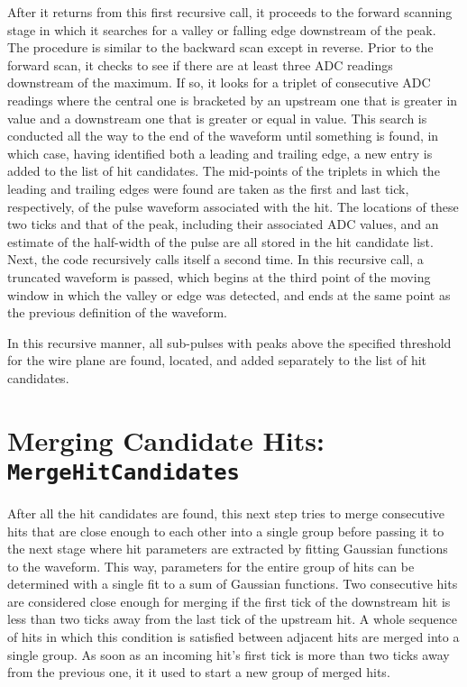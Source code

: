 \documentclass[a4paper]{article}
\begin{document}
After it returns from this first recursive call, it proceeds to the forward scanning stage in which it searches for a valley or falling edge downstream of the peak.  The procedure is similar to the backward scan except in reverse.  Prior to the forward scan, it checks to see if there are at least three ADC readings downstream of the maximum.  If so, it looks for a triplet of consecutive ADC readings where the central one is bracketed by an upstream one that is greater in value and a downstream one that is greater or equal in value. This search is conducted all the way to the end of the waveform until something is found, in which case, having identified both a leading and trailing edge, a new entry is added to the list of hit candidates.  The mid-points of the triplets in which the leading and trailing edges were found are taken as the first and last tick, respectively, of the pulse waveform associated with the hit.  The locations of these two ticks and that of the peak, including their associated ADC values, and an estimate of the half-width of the pulse are all stored in the hit candidate list. Next, the code recursively calls itself a second time.  In this recursive call, a truncated waveform is passed, which begins at the third point of the moving window in which the valley or edge was detected, and ends at the same point as the previous definition of the waveform.

In this recursive manner, all sub-pulses with peaks above the specified threshold for the wire plane are found, located, and added separately to the list of hit candidates.

\section{Merging Candidate Hits: \texttt{MergeHitCandidates}}

After all the hit candidates are found, this next step tries to merge consecutive hits that are close enough to each other into a single group before passing it to the next stage where hit parameters are extracted by fitting Gaussian functions to the waveform. This way, parameters for the entire group of hits can be determined with a single fit to a sum of Gaussian functions.  Two consecutive hits are considered close enough for merging if the first tick of the downstream hit is less than two ticks away from the last tick of the upstream hit.  A whole sequence of hits in which this condition is satisfied between adjacent hits are merged into a single group.  As soon as an incoming hit's first tick is more than two ticks away from the previous one, it it used to start a new group of merged hits.
\end{document}
